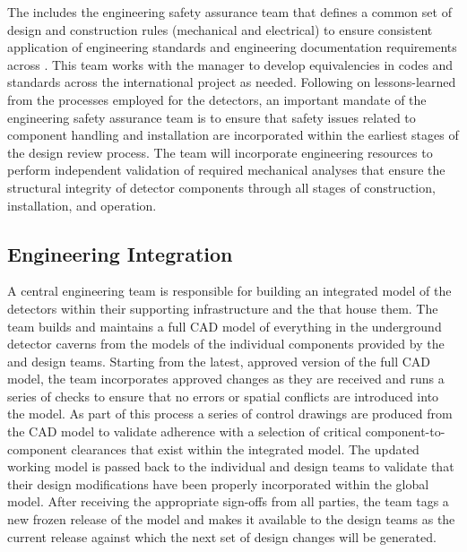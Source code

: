 The  includes the engineering safety assurance team that
defines a common set of design and construction rules (mechanical and
electrical) to ensure consistent application of engineering standards
and engineering documentation requirements across .
This team works with the   manager to develop
equivalencies in codes and standards across the international project
as needed.  Following on lessons-learned from the processes employed
for the  detectors, an important mandate of the
engineering safety assurance team is to ensure that safety issues
related to component handling and installation are incorporated within
the earliest stages of the design review process.  The 
team will incorporate engineering resources to perform independent
validation of required mechanical analyses that ensure the structural
integrity of detector components through all stages of construction,
installation, and operation.

\subsection{Engineering Integration}
\label{sec:dune_engineering}

A central  engineering team is responsible for building 
an integrated model of the detectors within their supporting
infrastructure and the  that house them.  The team 
builds and maintains a full \threed CAD model 
of everything in 
the underground detector caverns from the models of the individual
components provided by the  and  design 
teams.  Starting from the latest, approved version of the full CAD 
model, the  team incorporates approved changes as they 
are received and runs a series of checks to ensure that no errors 
or spatial conflicts are introduced into the model.  As part of 
this process a series of \twod control drawings are produced from 
the \threed CAD model to validate adherence with a selection of 
critical component-to-component clearances that exist within the 
integrated model.  The updated working model is passed back 
to the individual  and  design teams 
to validate that their design modifications have been properly 
incorporated within the global model.  After receiving the
appropriate sign-offs from all parties, the  team tags 
a new frozen release of the model and makes it available to the 
design teams as the current release against which the next set 
of design changes will be generated.

